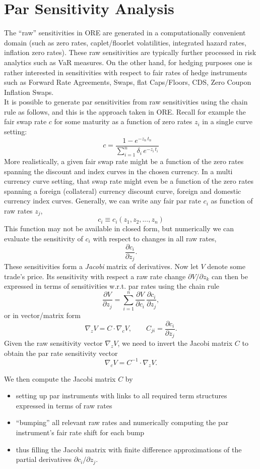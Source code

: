 \section{Par Sensitivity Analysis}
\label{app:par_sensi}

The ``raw'' sensitivities in ORE are generated in a computationally convenient domain (such as zero rates, caplet/floorlet volatilities, integrated hazard rates, inflation zero rates). These raw sensitivities are typically further processed in risk analytics such as VaR measures. On the other hand, for hedging purposes one is rather interested in sensitivities with respect to fair rates of hedge instruments such as Forward Rate Agreements, Swaps, flat Caps/Floors, CDS, Zero Coupon Inflation Swaps. \\

It is possible to generate par sensitivities from raw sensitivities using the chain rule as follows, and this is the approach taken in ORE. Recall for example the fair swap rate $c$ for some maturity as a function of zero rates $z_i$ in a single curve setting:
$$
c = \frac{1 - e^{-z_n\,t_n}}{\sum_{i=1}^n \delta_i\,e^{-z_i\, t_i}}
$$
More realistically, a given fair swap rate might be a function of the zero rates spanning the discount and index curves in the chosen currency. In a multi currency curve setting, that swap rate might even be a function of the zero rates spanning a foreign (collateral) currency discount curve, foreign and domestic currency index curves. Generally, we can write any fair par rate $c_i$ as function of raw rates $z_j$,
$$
c_i \equiv c_i(z_1, z_2, ..., z_n)
$$
This function may not be available in closed form, but numerically we can evaluate the sensitivity of $c_i$ with respect to changes in all raw rates,
$$
\frac{\partial c_i}{\partial z_j}.
$$
These sensitivities form a {\em Jacobi} matrix of derivatives. Now let $V$ denote some trade's price. Its sensitivity with respect a raw rate change $\partial V/\partial z_k$ can then be expressed in terms of sensitivities w.r.t. par rates using the chain rule
$$
\frac{\partial V}{\partial z_j} = \sum_{i=1}^n \frac{\partial V}{\partial c_i}\,\frac{\partial c_i}{\partial z_j},
$$
or in vector/matrix form
$$
\nabla_z V = C \cdot \nabla_c V, \qquad C_{ji} = \frac{\partial c_i}{\partial z_j}.
$$
Given the raw sensitivity vector $\nabla_z V$, we need to invert the Jacobi matrix $C$ to obtain the par rate sensitivity vector
$$
\nabla_c V = C^{-1} \cdot \nabla_z V.
$$

We then compute the Jacobi matrix $C$ by
\begin{itemize}
\item setting up par instruments with links to all required term structures expressed in terms of raw rates
\item ``bumping'' all relevant raw rates and numerically computing the par instrument's fair rate shift for each bump
\item thus filling the Jacobi matrix with finite difference approximations of the partial derivatives $\partial c_i/\partial z_j$.
\end{itemize}

